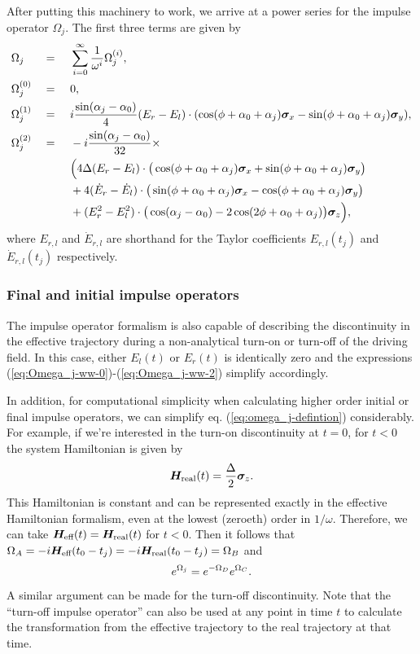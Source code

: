 After putting this machinery to work, we arrive at a power series for the impulse operator $\Omega_j$. The first three terms are given by
\begin{alignat}{3}
	&\Omega_j &&=\,\,&&\sum_{i=0}^\infty \frac{1}{\omega^i} \Omega_j^{(i)}, \\
	&\Omega_j^{(0)} && = &&0, \label{eq:Omega_j-ww-0} \\
	&\Omega_j^{(1)} && = &&i\frac{\sin(\alpha_j - \alpha_0)}{4}(E_r-E_l)\cdot(\cos(\phi+\alpha_0+\alpha_j)\bm{\sigma}_x - \sin(\phi+\alpha_0+\alpha_j)\bm{\sigma}_y), \label{eq:Omega_j-ww-1} \\
	&\Omega_j^{(2)} && = &&-i\frac{\sin(\alpha_j - \alpha_0)}{32} \times \label{eq:Omega_j-ww-2} \\
	& && && \Big( 4\Delta(E_r - E_l) \cdot \big( \cos(\phi+\alpha_0+\alpha_j) \bm{\sigma}_x + \sin(\phi+\alpha_0+\alpha_j) \bm{\sigma}_y \big)\nonumber \\
	& && && + 4(\dot{E}_r - \dot{E}_l) \cdot \big( \sin(\phi+\alpha_0+\alpha_j) \bm{\sigma}_x - \cos(\phi+\alpha_0+\alpha_j) \bm{\sigma}_y \big) \nonumber \\
	& && && + (E_r^2-E_l^2) \cdot \big(\cos(\alpha_j - \alpha_0) - 2\cos(2\phi+\alpha_0+\alpha_j)\big)\bm{\sigma}_z \Big), \nonumber 
\end{alignat}
where $E_{r,l}$ and $\dot{E}_{r,l}$ are shorthand for the Taylor coefficients $E_{r,l}(t_j)$ and $\dot{E}_{r,l}(t_j)$ respectively.

\subsubsection{Final and initial impulse operators}
The impulse operator formalism is also capable of describing the discontinuity in the effective trajectory during a non-analytical turn-on or turn-off of the driving field. In this case, either $E_l(t)$ or $E_r(t)$ is identically zero and the expressions (\ref{eq:Omega_j-ww-0})-(\ref{eq:Omega_j-ww-2}) simplify accordingly. 

In addition, for computational simplicity when calculating higher order initial or final impulse operators, we can simplify eq. (\ref{eq:omega_j-defintion}) considerably. For example, if we're interested in the turn-on discontinuity at $t=0$, for $t<0$ the system Hamiltonian is given by 
\begin{align}
	\label{eq:H-nodrive}
	\bm{H}_{\text{real}}(t) = \frac{\Delta}{2}\bm{\sigma}_z.
\end{align}
This Hamiltonian is constant and can be represented exactly in the effective Hamiltonian formalism, even at the lowest (zeroeth) order in $1/\omega$. Therefore, we can take $\bm{H}_{\text{eff}}(t) = \bm{H}_{\text{real}}(t)$ for $t<0$. Then it follows that $\Omega_A = -i\bm{H}_{\text{eff}} (t_0 - t_j) = -i\bm{H}_{\text{real}} (t_0 - t_j) = \Omega_B$ and
\begin{align}
	e^{\Omega_j} = e^{-\Omega_D}e^{\Omega_C}.
\end{align}
A similar argument can be made for the turn-off discontinuity. Note that the ``turn-off impulse operator'' can also be used at any point in time $t$ to calculate the transformation from the effective trajectory to the real trajectory at that time.

